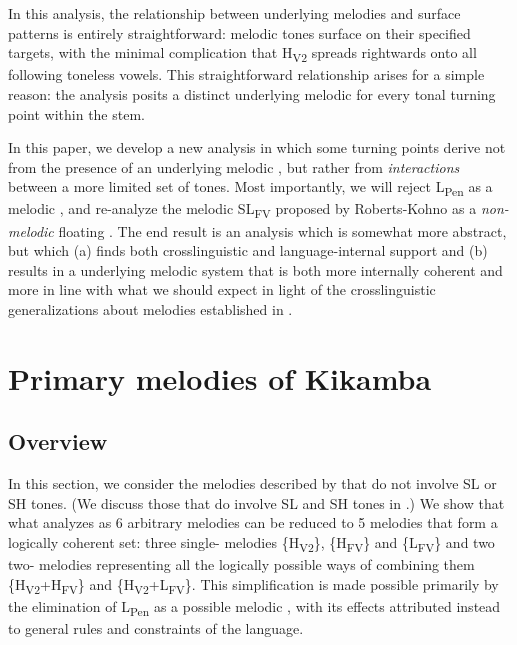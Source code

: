 \documentclass[output=paper,newtxmath,modfonts,nonflat,hidelinks]{langsci/langscibook}
\begin{document}
\newpage 
In this analysis, the relationship between underlying  melodies and surface  patterns is entirely straightforward: melodic tones surface on their specified targets, with the minimal complication that H\textsubscript{V2} spreads rightwards onto all following toneless vowels. This straightforward relationship arises for a simple reason: the analysis posits a distinct underlying melodic  for every tonal turning point within the stem.

In this paper, we develop a new analysis in which some turning points derive not from the presence of an underlying melodic , but rather from \textit{interactions} between a more limited set of tones. Most importantly, we will reject L\textsubscript{Pen} as a melodic , and re-analyze the melodic SL\textsubscript{FV}  proposed by Roberts-Kohno as a \textit{non-melodic} floating . The end result is an analysis which is somewhat more abstract, but which (a) finds both crosslinguistic and language-internal support and (b) results in a underlying melodic system that is both more internally coherent and more in line with what we should expect in light of the crosslinguistic generalizations about  melodies established in .

\section{Primary melodies of Kikamba}\label{sec:jones:3}
\subsection{Overview}\label{sec:jones:3.1}

In this section, we consider the melodies described by \citet{Roberts-Kohno2014} that do not involve SL or SH tones. (We discuss those that do involve SL and SH tones in .) We show that what \citet{Roberts-Kohno2014} analyzes as 6 arbitrary melodies can be reduced to 5 melodies that form a logically coherent set: three single- melodies \{H\textsubscript{V2}\}, \{H\textsubscript{FV}\} and \{L\textsubscript{FV}\} and two two- melodies representing all the logically possible ways of combining them \{H\textsubscript{V2}+H\textsubscript{FV}\} and \{H\textsubscript{V2}+L\textsubscript{FV}\}. This simplification is made possible primarily by the elimination of L\textsubscript{Pen} as a possible melodic , with its effects attributed instead to general rules and constraints of the language.
\end{document}
